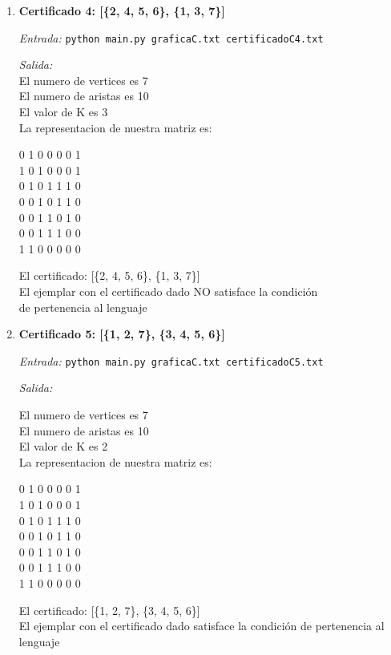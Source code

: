 \documentclass[12pt,letterpaper]{article}
\begin{document}
\begin{itemize}
\begin{itemize}
\begin{enumerate}
            \newpage
            \item \textbf{Certificado 4: [\{2, 4, 5, 6\}, \{1, 3, 7\}]}
            
            \textit{Entrada:} \texttt{python main.py graficaC.txt certificadoC4.txt}
            
            \textit{Salida:}\\
            El numero de vertices es 7\\
            El numero de aristas es 10\\
            El valor de K es 3\\
            La representacion de nuestra matriz es:
            \begin{center}
            0 1 0 0 0 0 1\\
            1 0 1 0 0 0 1\\
            0 1 0 1 1 1 0\\
            0 0 1 0 1 1 0\\
            0 0 1 1 0 1 0\\
            0 0 1 1 1 0 0\\
            1 1 0 0 0 0 0\\
            \end{center}
            El certificado: [\{2, 4, 5, 6\}, \{1, 3, 7\}]\\
            El ejemplar con el certificado dado NO satisface la condición\\
            de pertenencia al lenguaje
            
            \item \textbf{Certificado 5: [\{1, 2, 7\}, \{3, 4, 5, 6\}]}
            
            \textit{Entrada:}
            \texttt{python main.py graficaC.txt certificadoC5.txt}
            
            \textit{Salida:}

            El numero de vertices es 7 \\
            El numero de aristas es 10 \\
            El valor de K es 2 \\
            La representacion de nuestra matriz es:
            \begin{center}
                0 1 0 0 0 0 1 \\
                1 0 1 0 0 0 1 \\
                0 1 0 1 1 1 0 \\
                0 0 1 0 1 1 0 \\
                0 0 1 1 0 1 0 \\
                0 0 1 1 1 0 0 \\
                1 1 0 0 0 0 0 \\
            \end{center}
            El certificado: [\{1, 2, 7\}, \{3, 4, 5, 6\}] \\
            El ejemplar con el certificado dado satisface la condición
            de pertenencia al lenguaje
        \end{enumerate}
    \end{itemize}
\end{itemize}
\end{document}
